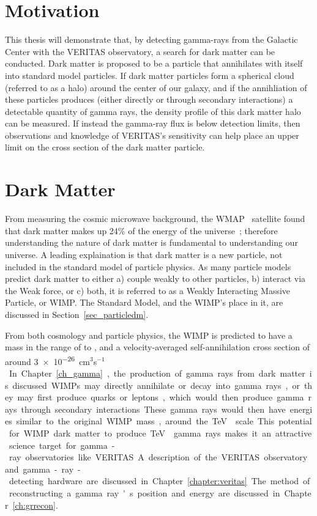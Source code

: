 \section{Motivation}
  This thesis will demonstrate that, by detecting gamma-rays from the Galactic Center with the VERITAS observatory, a search for dark matter can be conducted.
  Dark matter is proposed to be a particle that annihilates with itself into standard model particles.
  If dark matter particles form a spherical cloud (referred to as a halo) around the center of our galaxy, and if the annihliation of these particles produces (either directly or through secondary interactions) a detectable quantity of gamma rays, the density profile of this dark matter halo can be measured.
  If instead the gamma-ray flux is below detection limits, then observations and knowledge of VERITAS's sensitivity can help place an upper limit on the cross section of the dark matter particle.

\section{Dark Matter}

  From measuring the cosmic microwave background, the WMAP~\cite{wmap9year_obs} satellite found that dark matter makes up 24\% of the energy of the universe~\cite{pdg_2012}; therefore understanding the nature of dark matter is fundamental to understanding our universe.
  A leading explaination is that dark matter is a new particle, not included in the standard model of particle physics.
  As many particle models predict dark matter to either a) couple weakly to other particles, b) interact via the Weak force, or c) both, it is referred to as a Weakly Interacting Massive Particle, or WIMP.
  The Standard Model, and the WIMP's place in it, are discussed in Section~\ref{sec_particledm}.

  From both cosmology and particle physics, the WIMP is predicted to have a mass in the range of \GeV{} to \TeV{}, and a velocity-averaged self-annihilation cross section of around \nicetilde{}\SI{3e-26}{cm${}^3$s${}^{-1}$}.
  In Chapter~\ref{ch_gamma}, the production of gamma rays from dark matter is discussed.
  WIMPs may directly annihilate or decay into gamma rays, or they may first produce quarks or leptons, which would then produce gamma rays through secondary interactions.
  These gamma rays would then have energies similar to the original WIMP mass, around the \TeV{} scale.
  This potential for WIMP dark matter to produce \TeV{} gamma rays makes it an attractive science target for gamma-ray observatories like VERITAS.
  A description of the VERITAS observatory and gamma-ray-detecting hardware are discussed in Chapter~\ref{chapter:veritas}.
  The method of reconstructing a gamma ray's position and energy are discussed in Chapter~\ref{ch:grrecon}.

